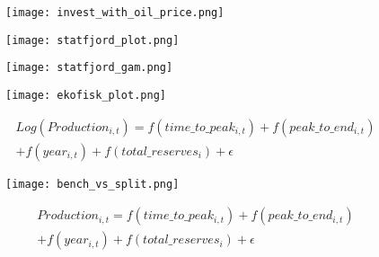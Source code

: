 \documentclass{beamer}
\begin{document}
\begin{frame}[plain]
	\begin{figure}
	\texttt{[image: invest\_with\_oil\_price.png]}
	\end{figure}
\end{frame}


\begin{frame}[plain]
	\begin{figure}
	\texttt{[image: statfjord\_plot.png]}
	\end{figure}
\end{frame}

\begin{frame}[plain]
	\begin{figure}
	\texttt{[image: statfjord\_gam.png]}
	\end{figure}
\end{frame}

\begin{frame}[plain]
	\begin{figure}
	\texttt{[image: ekofisk\_plot.png]}
	\end{figure}
\end{frame}

\begin{frame}[plain]
	\begin{multline}
	Log(Production_{i,t})=f(time\_to\_peak_{i,t}) + f(peak\_to\_end_{i,t}) \\
	+ f(year_{i,t}) + f(total\_reserves_i) + \epsilon
	\end{multline}
\end{frame}

\begin{frame}[plain]
	\begin{figure}
	\texttt{[image: bench\_vs\_split.png]}
	\end{figure}
\end{frame}

\begin{frame}[plain]
		\begin{multline}
	Production_{i,t}=f(time\_to\_peak_{i,t}) + f(peak\_to\_end_{i,t}) \\
	+ f(year_{i,t}) + f(total\_reserves_i) + \epsilon
	\end{multline}
\end{frame}
\end{document}
